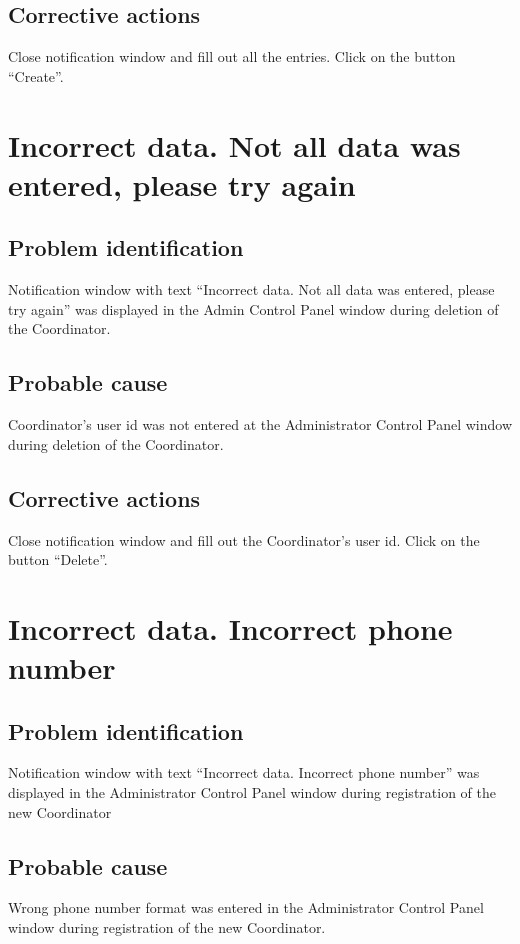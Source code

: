\subsection{Corrective actions}
Close notification window and fill out all the entries. Click on the button
``Create''.


\section{Incorrect data. Not all data was entered, please try again}

\subsection{Problem identification}
Notification window with text ``Incorrect data. Not all data was entered, please
try again'' was displayed in the Admin Control Panel window during deletion
of the Coordinator.

\subsection{Probable cause}
Coordinator's user id was not entered at the Administrator Control Panel window
during deletion of the Coordinator.

\subsection{Corrective actions}
Close notification window and fill out the Coordinator's user id. Click on the
button ``Delete''.


\section{Incorrect data. Incorrect phone number}

\subsection{Problem identification}
Notification window with text ``Incorrect data. Incorrect phone number''
was displayed in the Administrator Control Panel window during registration of
the new Coordinator

\subsection{Probable cause}
Wrong phone number format was entered in the Administrator Control Panel window
during registration of the new Coordinator.

